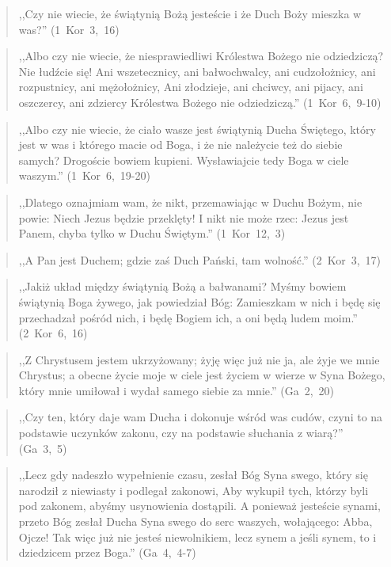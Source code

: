 \documentclass[10pt,a4paper,oneside]{article}
\begin{document}
\begin{quote}
,,Czy nie wiecie, że świątynią Bożą jesteście i że Duch Boży mieszka w was?'' (1~Kor~3,~16)
\end{quote}
\begin{quote}
,,Albo czy nie wiecie, że niesprawiedliwi Królestwa Bożego nie odziedziczą? Nie łudźcie się! Ani wszetecznicy, ani bałwochwalcy, ani cudzołożnicy, ani rozpustnicy, ani mężołożnicy, Ani złodzieje, ani chciwcy, ani pijacy, ani oszczercy, ani zdziercy Królestwa Bożego nie odziedziczą.'' (1~Kor~6,~9-10)
\end{quote}
\begin{quote}
,,Albo czy nie wiecie, że ciało wasze jest świątynią Ducha Świętego, który jest w was i którego macie od Boga, i że nie należycie też do siebie samych? Drogoście bowiem kupieni. Wysławiajcie tedy Boga w ciele waszym.'' (1~Kor~6,~19-20)
\end{quote}
\begin{quote}
,,Dlatego oznajmiam wam, że nikt, przemawiając w Duchu Bożym, nie powie: Niech Jezus będzie przeklęty! I nikt nie może rzec: Jezus jest Panem, chyba tylko w Duchu Świętym.'' (1~Kor~12,~3)
\end{quote}
\begin{quote}
,,A Pan jest Duchem; gdzie zaś Duch Pański, tam wolność.'' (2~Kor~3,~17)
\end{quote}
\begin{quote}
,,Jakiż układ między świątynią Bożą a bałwanami? Myśmy bowiem świątynią Boga żywego, jak powiedział Bóg: Zamieszkam w nich i będę się przechadzał pośród nich, i będę Bogiem ich, a oni będą ludem moim.'' (2~Kor~6,~16)
\end{quote}
\begin{quote}
,,Z Chrystusem jestem ukrzyżowany; żyję więc już nie ja, ale żyje we mnie Chrystus; a obecne życie moje w ciele jest życiem w wierze w Syna Bożego, który mnie umiłował i wydał samego siebie za mnie.'' (Ga~2,~20)
\end{quote}
\begin{quote}
,,Czy ten, który daje wam Ducha i dokonuje wśród was cudów, czyni to na podstawie uczynków zakonu, czy na podstawie słuchania z wiarą?'' (Ga~3,~5)
\end{quote}
\begin{quote}
,,Lecz gdy nadeszło wypełnienie czasu, zesłał Bóg Syna swego, który się narodził z niewiasty i podlegał zakonowi, Aby wykupił tych, którzy byli pod zakonem, abyśmy usynowienia dostąpili. A ponieważ jesteście synami, przeto Bóg zesłał Ducha Syna swego do serc waszych, wołającego: Abba, Ojcze! Tak więc już nie jesteś niewolnikiem, lecz synem a jeśli synem, to i dziedzicem przez Boga.'' (Ga~4,~4-7)
\end{quote}
\end{document}
